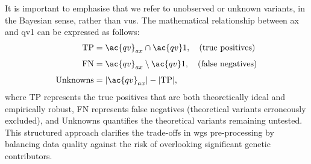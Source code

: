 It is important to emphasise that we refer to unobserved or unknown variants, in the Bayesian sense, rather than \ac{vus}. The mathematical relationship between \ac{ax} and \ac{qv}1 can be expressed as follows:
\begin{align*}
\text{TP} &= \ac{qv}_{ax} \cap \ac{qv}1, \quad \text{(true positives)}\\[1ex]
\text{FN} &= \ac{qv}_{ax} \setminus \ac{qv}1, \quad \text{(false negatives)}\\[1ex]
\text{Unknowns} &= |\ac{qv}_{ax}| - |\text{TP}|,
\end{align*}
where TP represents the true positives that are both theoretically ideal and empirically robust, FN represents false negatives (theoretical variants erroneously excluded), and Unknowns quantifies the theoretical variants remaining untested. This structured approach clarifies the trade-offs in \ac{wgs} pre-processing by balancing data quality against the risk of overlooking significant genetic contributors.





